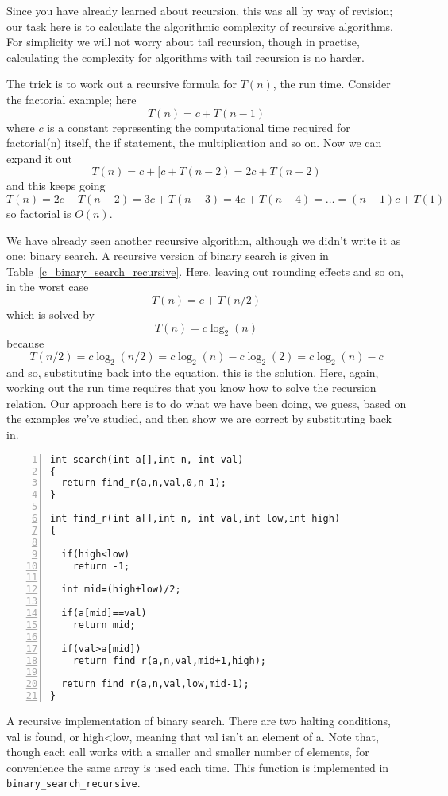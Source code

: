 \documentclass[11pt,a4paper]{scrartcl}
\begin{document}
Since you have already learned about recursion, this was all by way of
revision; our task here is to calculate the algorithmic complexity of
recursive algorithms. For simplicity we will not worry about tail
recursion, though in practise, calculating the complexity for
algorithms with tail recursion is no harder. 

The trick is to work out a recursive formula for $T(n)$, the run
time. Consider the factorial example; here
\begin{equation}
T(n)=c+T(n-1)
\end{equation}
where $c$ is a constant representing the computational time required
for factorial(n) itself, the if statement, the multiplication and so
on. Now we can expand it out
\begin{equation}
T(n)=c+[c+T(n-2)=2c+T(n-2)
\end{equation}
and this keeps going
\begin{equation}
T(n)=2c+T(n-2)=3c+T(n-3)=4c+T(n-4)=\ldots = (n-1)c+T(1)
\end{equation}
so factorial is $O(n)$.

We have already seen another recursive algorithm, although we didn't
write it as one: binary search. A recursive version of binary search is
given in Table~\ref{c_binary_search_recursive}. Here, leaving out
rounding effects and so on, in the worst case
\begin{equation}
T(n)=c+T(n/2)
\end{equation}
which is solved by 
\begin{equation}
T(n)=c\log_2(n)
\end{equation}
because 
\begin{equation}
T(n/2)=c\log_2(n/2)=c\log_2(n)-c\log_2(2)=c\log_2(n)-c
\end{equation}
and so, substituting back into the equation, this is the solution.
Here, again, working out the run time requires that you know how to
solve the recursion relation. Our approach here is to do what we have
been doing, we guess, based on the examples we've studied, and then
show we are correct by substituting back in.

\begin{table}
\begin{lstlisting}[numbers=left]
int search(int a[],int n, int val)
{
  return find_r(a,n,val,0,n-1);
}
 
int find_r(int a[],int n, int val,int low,int high)
{

  if(high<low)
    return -1;

  int mid=(high+low)/2;

  if(a[mid]==val)
    return mid;

  if(val>a[mid])
    return find_r(a,n,val,mid+1,high);
  
  return find_r(a,n,val,low,mid-1);
}
\end{lstlisting}
\caption{A recursive implementation of binary search. There are two
  halting conditions, val is found, or high<low, meaning that val
  isn't an element of a. Note that, though each call works with a
  smaller and smaller number of elements, for convenience the same
  array is used each time. This function is implemented in {\tt
    binary\_search\_recursive}.\label{c_binary_search_recursive}}
\end{table}
\end{document}
